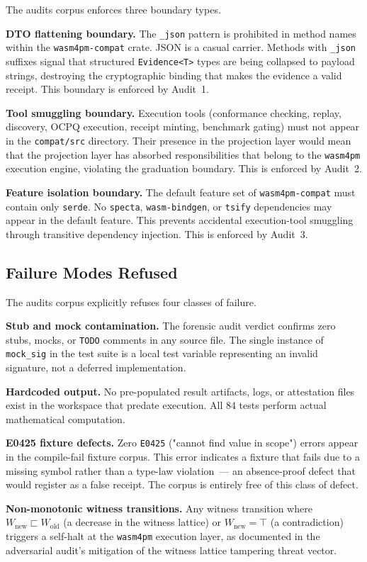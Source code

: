 The audits corpus enforces three boundary types.

\textbf{DTO flattening boundary.} The \texttt{\_json} pattern is prohibited in
method names within the \texttt{wasm4pm-compat} crate. JSON is a casual carrier.
Methods with \texttt{\_json} suffixes signal that structured \texttt{Evidence<T>}
types are being collapsed to payload strings, destroying the cryptographic binding
that makes the evidence a valid receipt. This boundary is enforced by Audit~1.

\textbf{Tool smuggling boundary.} Execution tools (conformance checking, replay,
discovery, OCPQ execution, receipt minting, benchmark gating) must not appear in
the \texttt{compat/src} directory. Their presence in the projection layer would
mean that the projection layer has absorbed responsibilities that belong to the
\texttt{wasm4pm} execution engine, violating the graduation boundary. This is
enforced by Audit~2.

\textbf{Feature isolation boundary.} The default feature set of
\texttt{wasm4pm-compat} must contain only \texttt{serde}. No \texttt{specta},
\texttt{wasm-bindgen}, or \texttt{tsify} dependencies may appear in the default
feature. This prevents accidental execution-tool smuggling through transitive
dependency injection. This is enforced by Audit~3.

\subsection{Failure Modes Refused}
\label{sec:audits-arch-failures}

The audits corpus explicitly refuses four classes of failure.

\textbf{Stub and mock contamination.} The forensic audit verdict confirms zero
stubs, mocks, or \texttt{TODO} comments in any source file. The single instance
of \texttt{mock\_sig} in the test suite is a local test variable representing an
invalid signature, not a deferred implementation.

\textbf{Hardcoded output.} No pre-populated result artifacts, logs, or
attestation files exist in the workspace that predate execution. All 84 tests
perform actual mathematical computation.

\textbf{E0425 fixture defects.} Zero \texttt{E0425} ("cannot find value in
scope") errors appear in the compile-fail fixture corpus. This error indicates a
fixture that fails due to a missing symbol rather than a type-law violation~---
an absence-proof defect that would register as a false receipt. The corpus is
entirely free of this class of defect.

\textbf{Non-monotonic witness transitions.} Any witness transition where
\(W_{\text{new}} \sqsubset W_{\text{old}}\) (a decrease in the witness lattice)
or \(W_{\text{new}} = \top\) (a contradiction) triggers a self-halt at the
\texttt{wasm4pm} execution layer, as documented in the adversarial audit's
mitigation of the witness lattice tampering threat vector.
